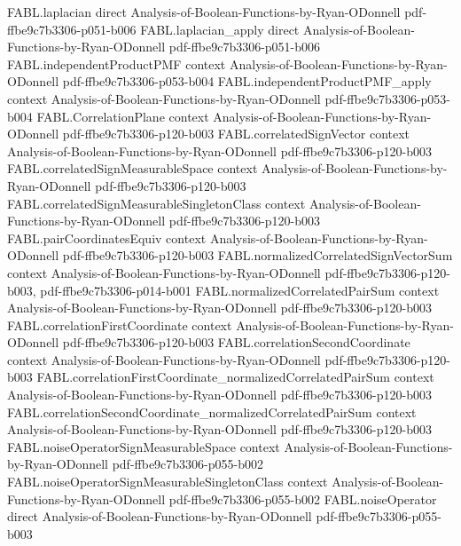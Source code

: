 \begin{theorem}
\proofstep
  {FABL.laplacian}
  {direct}
  {Analysis-of-Boolean-Functions-by-Ryan-ODonnell}
  {pdf-ffbe9c7b3306-p051-b006}
\proofstep
  {FABL.laplacian_apply}
  {direct}
  {Analysis-of-Boolean-Functions-by-Ryan-ODonnell}
  {pdf-ffbe9c7b3306-p051-b006}
\proofstep
  {FABL.independentProductPMF}
  {context}
  {Analysis-of-Boolean-Functions-by-Ryan-ODonnell}
  {pdf-ffbe9c7b3306-p053-b004}
\proofstep
  {FABL.independentProductPMF_apply}
  {context}
  {Analysis-of-Boolean-Functions-by-Ryan-ODonnell}
  {pdf-ffbe9c7b3306-p053-b004}
\proofstep
  {FABL.CorrelationPlane}
  {context}
  {Analysis-of-Boolean-Functions-by-Ryan-ODonnell}
  {pdf-ffbe9c7b3306-p120-b003}
\proofstep
  {FABL.correlatedSignVector}
  {context}
  {Analysis-of-Boolean-Functions-by-Ryan-ODonnell}
  {pdf-ffbe9c7b3306-p120-b003}
\proofstep
  {FABL.correlatedSignMeasurableSpace}
  {context}
  {Analysis-of-Boolean-Functions-by-Ryan-ODonnell}
  {pdf-ffbe9c7b3306-p120-b003}
\proofstep
  {FABL.correlatedSignMeasurableSingletonClass}
  {context}
  {Analysis-of-Boolean-Functions-by-Ryan-ODonnell}
  {pdf-ffbe9c7b3306-p120-b003}
\proofstep
  {FABL.pairCoordinatesEquiv}
  {context}
  {Analysis-of-Boolean-Functions-by-Ryan-ODonnell}
  {pdf-ffbe9c7b3306-p120-b003}
\proofstep
  {FABL.normalizedCorrelatedSignVectorSum}
  {context}
  {Analysis-of-Boolean-Functions-by-Ryan-ODonnell}
  {pdf-ffbe9c7b3306-p120-b003,
    pdf-ffbe9c7b3306-p014-b001}
\proofstep
  {FABL.normalizedCorrelatedPairSum}
  {context}
  {Analysis-of-Boolean-Functions-by-Ryan-ODonnell}
  {pdf-ffbe9c7b3306-p120-b003}
\proofstep
  {FABL.correlationFirstCoordinate}
  {context}
  {Analysis-of-Boolean-Functions-by-Ryan-ODonnell}
  {pdf-ffbe9c7b3306-p120-b003}
\proofstep
  {FABL.correlationSecondCoordinate}
  {context}
  {Analysis-of-Boolean-Functions-by-Ryan-ODonnell}
  {pdf-ffbe9c7b3306-p120-b003}
\proofstep
  {FABL.correlationFirstCoordinate_normalizedCorrelatedPairSum}
  {context}
  {Analysis-of-Boolean-Functions-by-Ryan-ODonnell}
  {pdf-ffbe9c7b3306-p120-b003}
\proofstep
  {FABL.correlationSecondCoordinate_normalizedCorrelatedPairSum}
  {context}
  {Analysis-of-Boolean-Functions-by-Ryan-ODonnell}
  {pdf-ffbe9c7b3306-p120-b003}
\proofstep
  {FABL.noiseOperatorSignMeasurableSpace}
  {context}
  {Analysis-of-Boolean-Functions-by-Ryan-ODonnell}
  {pdf-ffbe9c7b3306-p055-b002}
\proofstep
  {FABL.noiseOperatorSignMeasurableSingletonClass}
  {context}
  {Analysis-of-Boolean-Functions-by-Ryan-ODonnell}
  {pdf-ffbe9c7b3306-p055-b002}
\proofstep
  {FABL.noiseOperator}
  {direct}
  {Analysis-of-Boolean-Functions-by-Ryan-ODonnell}
  {pdf-ffbe9c7b3306-p055-b003}

\end{theorem}
